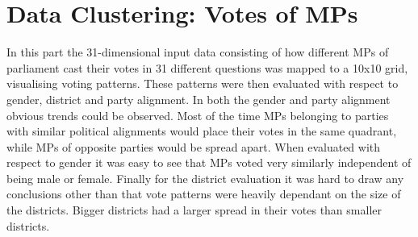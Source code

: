 \documentclass{article}
\begin{document}
\section{Data Clustering: Votes of MPs}
In this part the 31-dimensional input data consisting of how different MPs of parliament cast their votes in 31 different questions was mapped to a 10x10 grid, visualising voting patterns. These patterns were then evaluated with respect to gender, district and party alignment. In both the gender and party alignment obvious trends could be observed. Most of the time MPs belonging to parties with similar political alignments would place their votes in the same quadrant, while MPs of opposite parties would be spread apart. When evaluated with respect to gender it was easy to see that MPs voted very similarly independent of being male or female. Finally for the district evaluation it was hard to draw any conclusions other than that vote patterns were heavily dependant on the size of the districts. Bigger districts had a larger spread in their votes than smaller districts.
\end{document}
